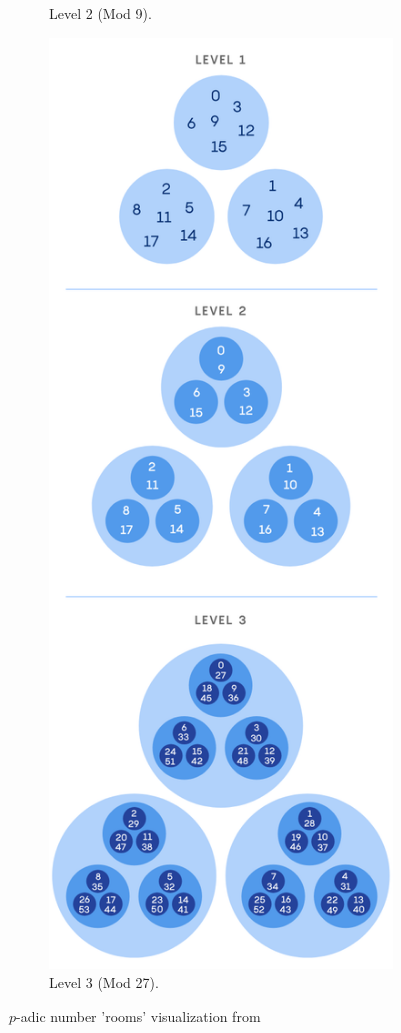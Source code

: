 \documentclass[11pt]{article}
\newcommand{\padic}{$p$-adic }
\begin{document}
\begin{figure}[h!]
\begin{subfigure}{0.30\textwidth}
    \caption{Level 2 (Mod 9).}
    \label{fig:second}
  \end{subfigure}
  \hfill
  \begin{subfigure}{0.30\textwidth}
    \centering
    \includegraphics[height=.2\textheight,trim={0 0 0 25.5cm},clip]{levels.png}
    \caption{Level 3 (Mod 27).}
    \label{fig:third}
  \end{subfigure}

  \caption{\padic number 'rooms' visualization from \cite{quant}}
  \label{fig:figures}

\end{figure}
\end{document}
